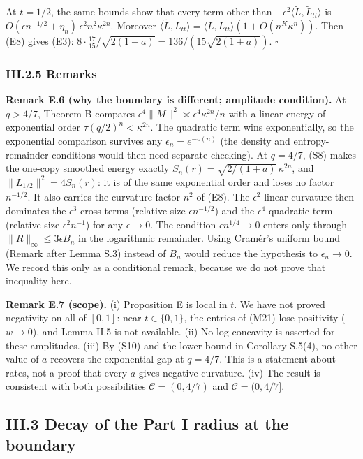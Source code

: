 \documentclass[
  british,
  10pt,
]{article}
\begin{document}
At \(t=1/2\), the same bounds show that every term other than
\(-\epsilon^2\langle\widetilde L,\widetilde L_{tt}\rangle\) is
\(O(\epsilon n^{-1/2}+\eta_n)\,\epsilon^2n^2\kappa^{2n}\). Moreover
\(\langle\widetilde L,\widetilde L_{tt}\rangle=\langle L,L_{tt}\rangle(1+O(n^{K}\kappa^{n}))\).
Then (E8) gives (E3):
\(8\cdot\frac{17}{15}/\sqrt{2(1+a)}=136/(15\sqrt{2(1+a)})\). \(\square\)

\subsubsection{III.2.5 Remarks}\label{iii.2.5-remarks}

\textbf{Remark E.6 (why the boundary is different; amplitude
condition).} At \(q>4/7\), Theorem B compares
\(\epsilon^4\|M\|^2\asymp\epsilon^4\kappa^{2n}/n\) with a linear energy
of exponential order \(\tau(q/2)^n<\kappa^{2n}\). The quadratic term
wins exponentially, so the exponential comparison survives any
\(\epsilon_n=e^{-o(n)}\) (the density and entropy-remainder conditions
would then need separate checking). At \(q=4/7\), (S8) makes the
one-copy smoothed energy exactly \(S_n(r)=\sqrt{2/(1+a)}\,\kappa^{2n}\),
and \(\|L_{1/2}\|^2=4S_n(r)\): it is of the same exponential order and
loses no factor \(n^{-1/2}\). It also carries the curvature factor
\(n^2\) of (E8). The \(\epsilon^2\) linear curvature then dominates the
\(\epsilon^3\) cross terms (relative size \(\epsilon n^{-1/2}\)) and the
\(\epsilon^4\) quadratic term (relative size \(\epsilon^2n^{-1}\)) for
any \(\epsilon\to0\). The condition \(\epsilon n^{1/4}\to0\) enters only
through \(\|R\|_\infty\le3\epsilon B_n\) in the logarithmic remainder.
Using Cramér's uniform bound (Remark after Lemma S.3) instead of \(B_n\)
would reduce the hypothesis to \(\epsilon_n\to0\). We record this only
as a conditional remark, because we do not prove that inequality here.

\textbf{Remark E.7 (scope).} (i) Proposition E is local in \(t\). We
have not proved negativity on all of \([0,1]\): near \(t\in\{0,1\}\),
the entries of (M21) lose positivity (\(w\to0\)), and Lemma II.5 is not
available. (ii) No log-concavity is asserted for these amplitudes. (iii)
By (S10) and the lower bound in Corollary S.5(4), no other value of
\(a\) recovers the exponential gap at \(q=4/7\). This is a statement
about rates, not a proof that every \(a\) gives negative curvature. (iv)
The result is consistent with both possibilities \(\mathcal C=(0,4/7)\)
and \(\mathcal C=(0,4/7]\).

\subsection{III.3 Decay of the Part I radius at the
boundary}\label{iii.3-decay-of-the-part-i-radius-at-the-boundary}
\end{document}
